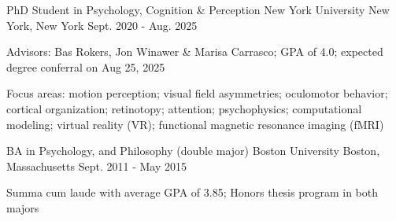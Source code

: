 \begin{cventries}
  \cventry
    {PhD Student in Psychology, Cognition \& Perception}
    {New York University}
    {New York, New York}
    {Sept. 2020 - Aug. 2025}
    {
      \begin{cvitems}
       \item {Advisors: Bas Rokers, Jon Winawer \& Marisa Carrasco; GPA of 4.0; expected degree conferral on Aug 25, 2025}
       \item {Focus areas: motion perception; visual field asymmetries; oculomotor behavior; cortical organization; retinotopy; attention; psychophysics; computational modeling; virtual reality (VR); functional magnetic resonance imaging (fMRI)}
      \end{cvitems}
    }
  \cventry
    {BA in Psychology, and Philosophy (double major)}
    {Boston University}
    {Boston, Massachusetts}
    {Sept. 2011 - May 2015}
    {
      \begin{cvitems}
       \item {Summa cum laude with average GPA of 3.85; Honors thesis program in both majors}
      \end{cvitems}
    }
\end{cventries}   


